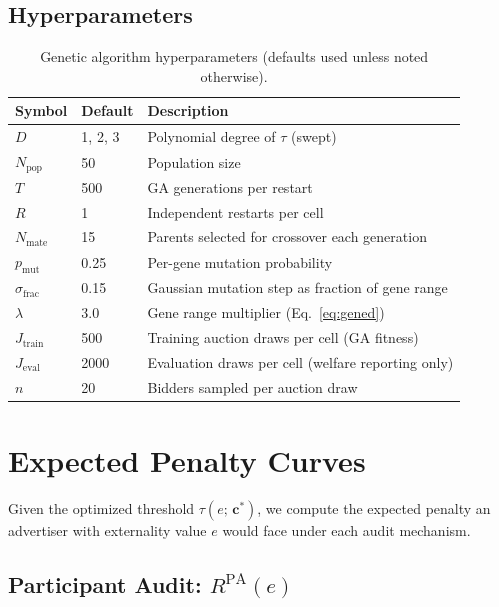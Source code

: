 \documentclass[11pt]{article}
\newcommand{\bsc}{\mathbf{c}}
\begin{document}
\subsection{Hyperparameters}
\label{sec:hyperparams}

\begin{table}[H]
\caption{Genetic algorithm hyperparameters (defaults used unless noted otherwise).}
\label{tab:ga_hyperparams}
\begin{center}
\begin{tabularx}{\textwidth}{llX}
\toprule
Symbol & Default & Description \\
\midrule
$D$ & 1, 2, 3 & Polynomial degree of $\tau$ (swept) \\
$N_{\text{pop}}$ & 50 & Population size \\
$T$ & 500 & GA generations per restart \\
$R$ & 1 & Independent restarts per cell \\
$N_{\text{mate}}$ & 15 & Parents selected for crossover each generation \\
$p_{\text{mut}}$ & 0.25 & Per-gene mutation probability \\
$\sigma_{\text{frac}}$ & 0.15 & Gaussian mutation step as fraction of gene range \\
$\lambda$ & 3.0 & Gene range multiplier (Eq.~\ref{eq:gened}) \\
$J_{\text{train}}$ & 500  & Training auction draws per cell (GA fitness) \\
$J_{\text{eval}}$  & 2000 & Evaluation draws per cell (welfare reporting only) \\
$n$ & 20 & Bidders sampled per auction draw \\
\bottomrule
\end{tabularx}
\end{center}
\end{table}


\section{Expected Penalty Curves}
\label{sec:penalties}

Given the optimized threshold $\tau(e;\,\bsc^*)$, we compute the expected penalty
an advertiser with externality value $e$ would face under each audit mechanism.

\subsection{Participant Audit: $R^{\text{PA}}(e)$}
\label{sec:r_pa}
\end{document}
